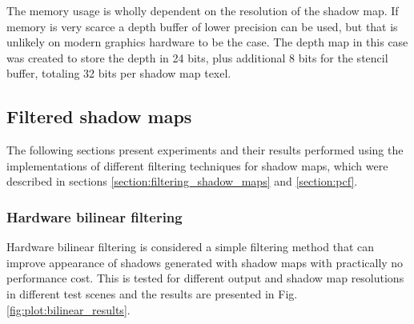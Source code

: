 The memory usage is wholly dependent on the resolution of the shadow map. If memory is very scarce a depth buffer of lower precision can be used, but that is unlikely on modern graphics hardware to be the case. The depth map in this case was created to store the depth in 24 bits, plus additional 8 bits for the stencil buffer, totaling 32 bits per shadow map texel.

\subsection{Filtered shadow maps}
The following sections present experiments and their results performed using the implementations of different filtering techniques for shadow maps, which were described in sections \ref{section:filtering_shadow_maps} and \ref{section:pcf}.

\subsubsection{Hardware bilinear filtering}
Hardware bilinear filtering is considered a simple filtering method that can improve appearance of shadows generated with shadow maps with practically no performance cost. This is tested for different output and shadow map resolutions in different test scenes and the results are presented in Fig. \ref{fig:plot:bilinear_results}.

